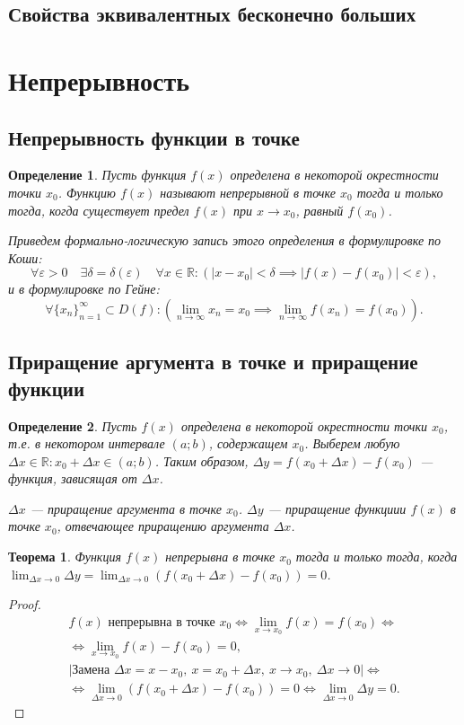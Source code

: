 \documentclass[a4paper,12pt]{article} %
\newtheorem{definition}{Определение}[section]
\newtheorem{theorem}{Теорема}[section]
\theoremstyle{remark}
\theoremstyle{definition}
\begin{document}
\subsection{Свойства эквивалентных бесконечно больших}

\newpage
\section{Непрерывность}
\subsection{Непрерывность функции в точке}
\begin{definition}
	Пусть функция $f(x)$ определена в некоторой окрестности точки $x_0$. Функцию $f(x)$ называют непрерывной в точке $x_0$ тогда и только тогда, когда существует предел $f(x)$ при $x\to x_0$, равный $f(x_0)$.

	Приведем формально-логическую запись этого определения в формулировке по Коши:
	\[
	\forall \varepsilon > 0 \quad \exists \delta=\delta(\varepsilon) \quad \forall  x \in  \mathbb{R} : (|x-x_0| < \delta \implies |f(x) - f(x_0)| < \varepsilon),
	\] 
	и в формулировке по Гейне:
	\[
	\forall \{x_n\}_{n=1}^{\infty} \subset D(f) : (\lim_{n \to \infty} x_n = x_0 \implies \lim_{n \to \infty} f(x_n) = f(x_0))
	.\] 
\end{definition}

\subsection{Приращение аргумента в точке и приращение функции}
\begin{definition}
Пусть $f(x)$ определена в некоторой окрестности точки $x_0$, т.е. в некотором интервале $(a; b)$, содержащем $x_0$. Выберем любую $\Delta x \in \mathbb{R} : x_0+\Delta x \in (a; b)$. Таким образом, $\Delta y = f(x_0 + \Delta x) - f(x_0)$ --- функция, зависящая от $\Delta x$.

$\Delta x$ --- приращение аргумента в точке $x_0$.
$\Delta y$ --- приращение функциии $f(x)$ в точке $x_0$, отвечающее приращению аргумента $\Delta x$.
\end{definition}

\begin{theorem}
	Функция $f(x)$ непрерывна в точке $x_0$ тогда и только тогда, когда $\lim_{\Delta x \to 0} \Delta y = \lim_{\Delta x \to 0} (f(x_0+\Delta x) - f(x_0)) = 0$.
\end{theorem}
\begin{proof}
	\begin{multline}
		f(x) \text{ непрерывна в точке } x_0 \iff \lim_{x \to x_0} f(x) = f(x_0) \iff \\
		\iff \lim_{x \to x_0} f(x) - f(x_0) = 0, \\
		| \text{Замена } \Delta x = x - x_0, \ x = x_0 + \Delta x, \ x \to x_0, \ \Delta x \to 0 | \iff \\
		\iff \lim_{\Delta x \to 0} (f(x_0 + \Delta x) - f(x_0)) = 0 \iff \lim_{\Delta x \to 0} \Delta y = 0.
	\end{multline}
\end{proof}
\end{document}
